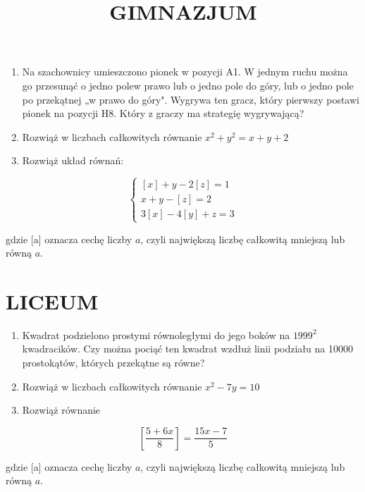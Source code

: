 \documentclass[10pt]{article}
\title{GIMNAZJUM }
\author{}
\date{}
\begin{document}
\maketitle
\begin{enumerate}
  \item Na szachownicy umieszczono pionek w pozycji A1. W jednym ruchu można go przesunąć o jedno polew prawo lub o jedno pole do góry, lub o jedno pole po przekątnej „w prawo do góry". Wygrywa ten gracz, który pierwszy postawi pionek na pozycji H8. Który z graczy ma strategię wygrywającą?
  \item Rozwiąż w liczbach całkowitych równanie \(x^{2}+y^{2}=x+y+2\)
  \item Rozwiąż układ równań:
\end{enumerate}

\[
\left\{\begin{array}{c}
{[x]+y-2[z]=1} \\
x+y-[z]=2 \\
3[x]-4[y]+z=3
\end{array}\right.
\]

gdzie [a] oznacza cechę liczby \(a\), czyli największą liczbę całkowitą mniejszą lub równą \(a\).

\section*{LICEUM}
\begin{enumerate}
  \item Kwadrat podzielono prostymi równoległymi do jego boków na \(1999^{2}\) kwadracików. Czy można pociąć ten kwadrat wzdłuż linii podziału na 10000 prostokątów, których przekątne są równe?
  \item Rozwiąż w liczbach całkowitych równanie \(x^{2}-7 y=10\)
  \item Rozwiąż równanie
\end{enumerate}

\[
\left[\frac{5+6 x}{8}\right]=\frac{15 x-7}{5}
\]

gdzie [a] oznacza cechę liczby \(a\), czyli największą liczbę całkowitą mniejszą lub równą \(a\).
\end{document}
